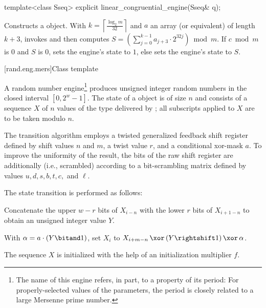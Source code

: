 %
\begin{itemdecl}
template<class Sseq> explicit linear_congruential_engine(Sseq& q);
\end{itemdecl}

\begin{itemdescr}
\pnum\effects Constructs a  object.
 With
 $ k = \left\lceil \frac{\log_2 m}
                        {32}
            \right\rceil
 $
 and $a$ an array (or equivalent)
 of length $k + 3$,
 invokes 
 and then computes
 $ S = \left(\sum_{j=0}^{k-1}a_{j+3} \cdot 2^{32j} \right) \bmod m $.
 If
   $ c \bmod m $ is $0$
 and
   $S$ is $0$,
 sets the engine's state to $1$,
 else sets the engine's state
 to $S$.
\end{itemdescr}


[rand.eng.mers]{Class template }%
%

\pnum
A  random number
engine\footnote{The name of this engine refers, in part, to a property of its period:
 For properly-selected values of the parameters,
 the period is closely related to a large Mersenne prime number.}
produces unsigned integer random numbers
in the closed interval $[0,2^w-1]$.
The
%
%
state
of a  object 
is of size $n$
and consists of a sequence $X$
of $n$ values of the type delivered by ;
all subscripts applied to $X$ are to be taken modulo $n$.

\pnum
The transition algorithm%
%
employs a twisted generalized feedback shift register
defined by shift values $n$ and $m$, a twist value $r$,
and a conditional xor-mask $a$.
To improve the uniformity of the result,
the bits of the raw shift register are additionally 
(i.e., scrambled)
according to a bit-scrambling matrix
defined by values $u, d, s, b, t, c,$ and $\ell$.

The state transition is performed as follows:
\begin{enumeratea}
 \item
   Concatenate
     the upper $w-r$ bits of $X_{i-n}$
   with
     the lower $r$ bits of $X_{i+1-n}$
   to obtain an unsigned integer value $Y$.
 \item
   With $\alpha = a \cdot (Y \bitand 1)$,
   set $X_i$ to
     $X_{i+m-n} \, \xor \, (Y \rightshift 1) \, \xor \, \alpha$.
\end{enumeratea}
The sequence $X$ is initialized
with the help of an initialization multiplier $f$.

